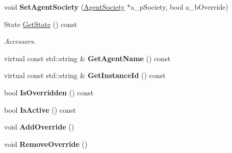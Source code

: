 \begin{DoxyCompactItemize}
void {\bfseries Set\+Agent\+Society} (\hyperlink{class_agent_society}{Agent\+Society} $\ast$a\+\_\+p\+Society, bool a\+\_\+b\+Override)
\item 
\mbox{\label{class_i_agent_aeaab9245e752a5f35c48f869a6816314}} 
State \hyperlink{class_i_agent_aeaab9245e752a5f35c48f869a6816314}{Get\+State} () const
\begin{DoxyCompactList}\small\item\em Accessors. \end{DoxyCompactList}\item 
\mbox{\label{class_i_agent_a8e065535745f20d1597114cc4f6d4282}} 
virtual const std\+::string \& {\bfseries Get\+Agent\+Name} () const
\item 
\mbox{\label{class_i_agent_a14ae7bbeb1f1a2ae2f74abbd097c1a52}} 
virtual const std\+::string \& {\bfseries Get\+Instance\+Id} () const
\item 
\mbox{\label{class_i_agent_aea4a4f956bc9f1f1e1f2b763232027eb}} 
bool {\bfseries Is\+Overridden} () const
\item 
\mbox{\label{class_i_agent_a21762f47ec7fed02949494a980fb6414}} 
bool {\bfseries Is\+Active} () const
\item 
\mbox{\label{class_i_agent_ab3dc0886aafb612cc9db880dc6a39648}} 
void {\bfseries Add\+Override} ()
\item 
\mbox{\label{class_i_agent_a65e6a2c685607a24d6ced32f96be46c6}} 
void {\bfseries Remove\+Override} ()
\end{DoxyCompactItemize}

